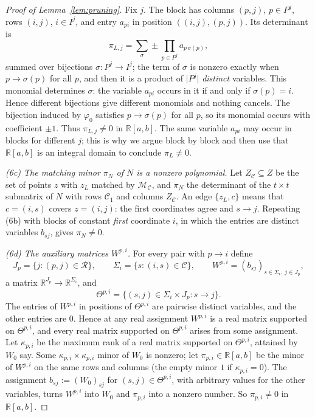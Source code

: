 \documentclass[11pt]{article}
\theoremstyle{remark}
\newcommand{\abs}[1]{\lvert #1\rvert}
\newcommand{\R}{\mathbb R}
\newcommand{\cC}{\mathcal C}
\newcommand{\cM}{\mathcal M}
\begin{document}
\begin{proof}[Proof of Lemma~\ref{lem:pruning}]
Fix $j$. The block has columns $(p,j)$, $p\in P^j$, rows $(i,j)$,
$i\in I^j$, and entry $a_{pi}$ in position $((i,j),(p,j))$. Its determinant
is
\[
 \pi_{L,j}=\sum_{\sigma}\pm\prod_{p\in P^j}a_{p\,\sigma(p)},
\]
summed over bijections $\sigma:P^j\to I^j$; the term of $\sigma$ is nonzero
exactly when $p\to\sigma(p)$ for all $p$, and then it is a product of
$\abs{P^j}$ \emph{distinct} variables. This monomial determines $\sigma$:
the variable $a_{pi}$ occurs in it if and only if $\sigma(p)=i$. Hence
different bijections give different monomials and nothing cancels. The
bijection induced by $\varphi_0$ satisfies $p\to\sigma(p)$ for all $p$, so
its monomial occurs with coefficient $\pm1$. Thus $\pi_{L,j}\ne0$ in
$\R[a,b]$. The same variable $a_{pi}$ may occur in blocks for different $j$;
this is why we argue block by block and then use that $\R[a,b]$ is an
integral domain to conclude $\pi_L\ne0$.

\smallskip\noindent\emph{(6c) The matching minor $\pi_N$ of $N$ is a
nonzero polynomial.} Let $Z_{\cC}\subseteq Z$ be the set of points $z$ with
$z_L$ matched by $\cM_{\cC}$, and $\pi_N$ the determinant of the
$t\times t$ submatrix of $N$ with rows $\cC_1$ and columns $Z_{\cC}$. An
edge $\{z_L,c\}$ means that $c=(i,s)$ covers $z=(i,j)$: the first coordinates
agree and $s\to j$. Repeating (6b) with blocks of constant \emph{first}
coordinate $i$, in which the entries are distinct variables $b_{sj}$, gives
$\pi_N\ne0$.

\smallskip\noindent\emph{(6d) The auxiliary matrices $W^{p,i}$.}
For every pair with $p\to i$ define
\[
 J_p=\{j:(p,j)\in\mathcal R\},\qquad
 \Sigma_i=\{s:(i,s)\in\mathcal C\},\qquad
 W^{p,i}=(b_{sj})_{s\in \Sigma_i,\ j\in J_p},
\]
a matrix $\R^{J_p}\to\R^{\Sigma_i}$, and
\[
 \Theta^{p,i}=\{(s,j)\in \Sigma_i\times J_p:s\to j\}.
\]
The entries of $W^{p,i}$ in positions of $\Theta^{p,i}$ are pairwise
distinct variables, and the other entries are $0$. Hence at any real
assignment $W^{p,i}$ is a real matrix supported on $\Theta^{p,i}$, and every
real matrix supported on $\Theta^{p,i}$ arises from some assignment. Let
$\kappa_{p,i}$ be the maximum rank of a real matrix supported on
$\Theta^{p,i}$, attained by $W_0$ say. Some
$\kappa_{p,i}\times\kappa_{p,i}$ minor of $W_0$ is nonzero; let
$\pi_{p,i}\in\R[a,b]$ be the minor of $W^{p,i}$ on the same rows and
columns (the empty minor $1$ if $\kappa_{p,i}=0$). The assignment
$b_{sj}:=(W_0)_{sj}$ for $(s,j)\in\Theta^{p,i}$, with arbitrary values for
the other variables, turns $W^{p,i}$ into $W_0$ and $\pi_{p,i}$ into a
nonzero number. So $\pi_{p,i}\ne0$ in $\R[a,b]$.


\end{proof}
\end{document}
